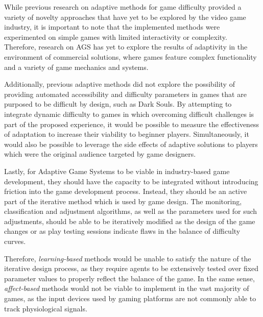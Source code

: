 
While previous research on adaptive methods for game difficulty provided a variety of novelty approaches that have yet to be explored by the video game industry, it is important to note that the implemented methods were experimented on simple games with limited interactivity or complexity. Therefore, research on AGS has yet to explore the results of adaptivity in the environment of commercial solutions, where games feature complex functionality and a variety of game mechanics and systems.

Additionally, previous adaptive methods did not explore the possibility of providing automated accessibility and difficulty parameters in games that are purposed to be difficult by design, such as Dark Souls. By attempting to integrate dynamic difficulty to games in which overcoming difficult challenges is part of the proposed experience, it would be possible to measure the effectiveness of adaptation to increase their viability to beginner players. Simultaneously, it would also be possible to leverage the side effects of adaptive solutions to players which were the original audience targeted by game designers.

Lastly, for Adaptive Game Systems to be viable in industry-based game development, they should have the capacity to be integrated without introducing friction into the game development process. Instead, they should be an active part of the iterative method which is used by game design. The monitoring, classification and adjustment algorithms, as well as the parameters used for such adjustments, should be able to be iteratively modified as the design of the game changes or as play testing sessions indicate flaws in the balance of difficulty curves. 

Therefore, \emph{learning-based} methods would be unable to satisfy the nature of the iterative design process, as they require agents to be extensively tested over fixed parameter values to properly reflect the balance of the game. In the same sense, \emph{affect-based} methods would not be viable to implement in the vast majority of games, as the input devices used by gaming platforms are not commonly able to track physiological signals.

